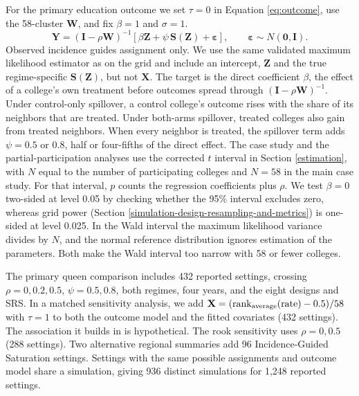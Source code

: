\documentclass[11pt]{article}
\begin{document}
For the primary education outcome we set \(\tau=0\) in Equation
\ref{eq:outcome}, use the 58-cluster \(\mathbf{W}\), and fix \(\beta=1\)
and \(\sigma=1\).
\begin{equation}
\mathbf{Y}=(\mathbf{I}-\rho \mathbf{W})^{-1}[\beta \mathbf{Z}+\psi\,\mathbf{S}(\mathbf{Z})+\boldsymbol{\varepsilon}],\qquad \boldsymbol{\varepsilon}\sim N(\mathbf{0},\mathbf{I}).
\label{eq:nc-education}
\end{equation}
Observed incidence guides assignment only. We use the same validated
maximum likelihood estimator as on the grid and include an intercept,
\(\mathbf{Z}\) and the true regime-specific \(\mathbf{S}(\mathbf{Z})\),
but not \(\mathbf{X}\). The target is the direct coefficient \(\beta\), the effect of a college's own treatment before outcomes spread through \((\mathbf{I}-\rho \mathbf{W})^{-1}\). Under control-only spillover, a
control college's outcome rises with the share of its neighbors that are
treated. Under both-arms spillover, treated colleges also gain from
treated neighbors. When every neighbor is treated, the spillover term
adds \(\psi=0.5\) or \(0.8\), half or four-fifths of the direct effect.
The case study and the partial-participation analyses use the corrected
$t$ interval in Section \ref{estimation}, with $N$ equal to the number
of participating colleges and $N=58$ in the main case study. For that
interval, $p$ counts the regression coefficients plus $\rho$. We test
$\beta=0$ two-sided at level 0.05 by checking whether the 95\% interval
excludes zero, whereas grid power (Section
\ref{simulation-design-resampling-and-metrics}) is one-sided at level
0.025. In the Wald interval the maximum likelihood variance divides by
$N$, and the normal reference distribution ignores estimation of the
parameters. Both make the Wald interval too narrow with 58 or fewer
colleges.

The primary queen comparison includes 432 reported settings, crossing
\(\rho=0,0.2,0.5\), \(\psi=0.5,0.8\), both regimes, four years,
and the eight designs and SRS. In a matched sensitivity analysis,
we add \(\mathbf{X}=(\operatorname{rank}_{\rm average}(\text{rate})-0.5)/58\)
with \(\tau=1\) to both the outcome model and the fitted covariates
(432 settings). The association it builds in is hypothetical. The rook
sensitivity uses \(\rho=0,0.5\) (288 settings). Two alternative regional
summaries add 96 Incidence-Guided Saturation settings. Settings with the
same possible assignments and outcome model share a simulation, giving
936 distinct simulations for 1,248 reported settings.
\end{document}
